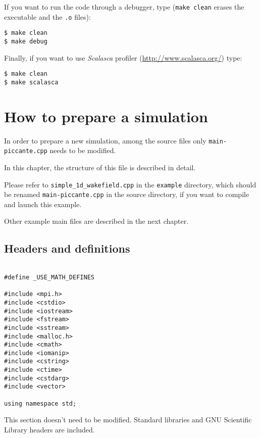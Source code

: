 \documentclass[11pt,a4paper]{report}
\begin{document}
If you want to run the code through a debugger, type (\verb+make clean+ erases the executable and the \verb+.o+ files):
\begin{verbatim}
$ make clean
$ make debug
\end{verbatim}
Finally, if you want to use \emph{Scalasca} profiler (\url{http://www.scalasca.org/}) type:
\begin{verbatim}
$ make clean
$ make scalasca
\end{verbatim}

\chapter{How to prepare a simulation}
In order to prepare a new simulation, among the source files only \verb+main-piccante.cpp+ needs to be modified.

In this chapter, the structure of this file is described in detail.

Please refer to \verb+simple_1d_wakefield.cpp+ in the \verb+example+ directory, which should be renamed \verb+main-piccante.cpp+ in the source directory, if you want to compile and launch this example.

Other example main files are described in the next chapter.

\section{Headers and definitions}
\begin{lstlisting}[backgroundcolor=\color{no_modify}]

#define _USE_MATH_DEFINES

#include <mpi.h>
#include <cstdio>
#include <iostream>
#include <fstream>
#include <sstream>
#include <malloc.h>
#include <cmath>
#include <iomanip>
#include <cstring>
#include <ctime>
#include <cstdarg> 
#include <vector>

using namespace std;
\end{lstlisting}
This section doesn't need to be modified. Standard libraries and GNU Scientific Library headers are included.

\end{document}
